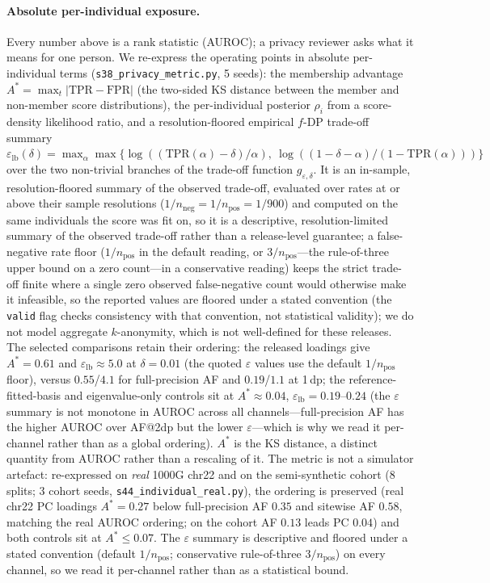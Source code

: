 \documentclass[11pt]{article}
\begin{document}
\paragraph{Absolute per-individual exposure.} Every number above is a rank
statistic (AUROC); a privacy reviewer asks what it means for one person. We
re-express the operating points in absolute per-individual terms
(\texttt{s38\_privacy\_metric.py}, 5 seeds): the membership advantage
$A^\ast=\max_t|\text{TPR}-\text{FPR}|$ (the two-sided KS distance between the
member and non-member score distributions), the per-individual
posterior $\rho_i$ from a score-density likelihood ratio, and a resolution-floored
empirical $f$-DP trade-off summary
$\varepsilon_{\text{lb}}(\delta)=\max_\alpha\max\{\log((\text{TPR}(\alpha)-\delta)/\alpha),\ \log((1-\delta-\alpha)/(1-\text{TPR}(\alpha)))\}$
over the two non-trivial branches of the trade-off function $g_{\varepsilon,\delta}$.
It is an in-sample, resolution-floored summary of the observed trade-off,
evaluated over rates at or above their sample
resolutions ($1/n_{\text{neg}}{=}1/n_{\text{pos}}{=}1/900$) and computed
on the same individuals the score was fit on, so
it is a descriptive, resolution-limited summary of the observed trade-off rather
than a release-level guarantee; a false-negative rate floor
($1/n_{\text{pos}}$ in the default reading, or $3/n_{\text{pos}}$---the
rule-of-three upper bound on a zero count---in a conservative reading) keeps the
strict trade-off finite where a single zero observed false-negative count would
otherwise make it infeasible, so the reported values are floored under a stated
convention (the \texttt{valid} flag checks consistency with that convention, not
statistical validity); we do not model
aggregate $k$-anonymity, which is not
well-defined for these releases. The selected comparisons retain their ordering:
the released
loadings give $A^\ast{=}0.61$ and $\varepsilon_{\text{lb}}{\approx}5.0$ at
$\delta{=}0.01$ (the quoted $\varepsilon$ values use the default $1/n_{\text{pos}}$
floor), versus $0.55$/$4.1$ for full-precision AF and $0.19$/$1.1$ at
1\,dp; the reference-fitted-basis and eigenvalue-only controls sit at
$A^\ast{\approx}0.04$, $\varepsilon_{\text{lb}}{=}0.19$--$0.24$ (the $\varepsilon$
summary is not monotone in AUROC across all channels---full-precision AF has the
higher AUROC over AF@2dp but the lower $\varepsilon$---which is why we read it
per-channel rather than as a global ordering). $A^\ast$ is the KS
distance, a distinct quantity from AUROC rather than a rescaling of it. The
metric is not a simulator artefact: re-expressed on
\emph{real} 1000G chr22 and on the semi-synthetic cohort (8 splits; 3 cohort
seeds, \texttt{s44\_individual\_real.py}), the ordering is preserved (real chr22
PC loadings $A^\ast{=}0.27$ below full-precision AF $0.35$ and sitewise AF
$0.58$, matching the real
AUROC ordering; on the cohort AF $0.13$ leads PC $0.04$) and both controls sit at
$A^\ast{\le}0.07$. The $\varepsilon$ summary is descriptive and floored under a
stated convention (default $1/n_{\text{pos}}$; conservative rule-of-three
$3/n_{\text{pos}}$) on every channel, so we read it per-channel rather than as a
statistical bound.
\end{document}
